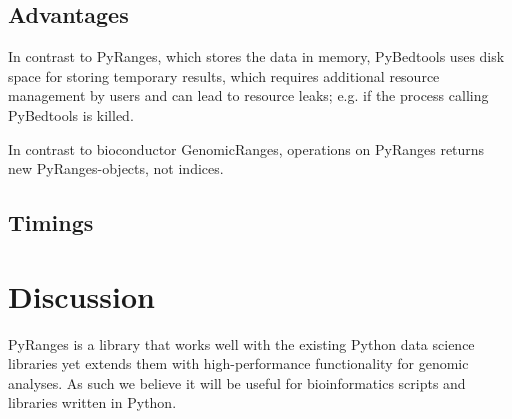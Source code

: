 \documentclass[10pt,letterpaper]{article}
\begin{document}
\subsection*{Advantages}

In contrast to PyRanges, which stores the data in memory, PyBedtools uses disk
space for storing temporary results, which requires additional resource
management by users and can lead to resource leaks; e.g. if the process calling
PyBedtools is killed.

In contrast to bioconductor GenomicRanges, operations on PyRanges returns new
PyRanges-objects, not indices.

\subsection*{Timings}



\section*{Discussion}

PyRanges is a library that works well with the existing Python data science
libraries yet extends them with high-performance functionality for genomic
analyses. As such we believe it will be useful for bioinformatics scripts and
libraries written in Python.




\end{document}
